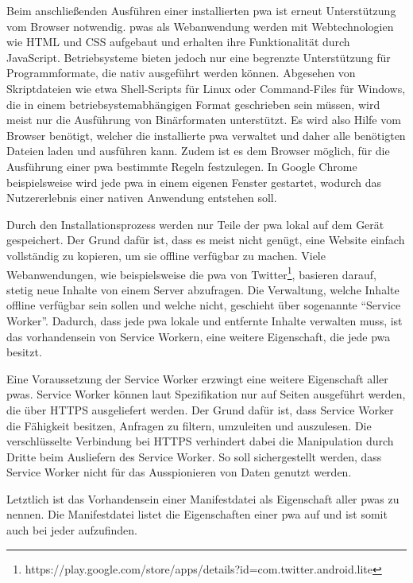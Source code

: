\documentclass[12pt, parskip=half]{scrartcl}       %
\begin{document}
Beim anschließenden Ausführen einer installierten \ac{pwa} ist erneut Unterstützung vom Browser notwendig.
\acp{pwa} als Webanwendung werden mit Webtechnologien wie HTML und CSS aufgebaut und erhalten ihre Funktionalität durch JavaScript.
Betriebsysteme bieten jedoch nur eine begrenzte Unterstützung für Programmformate, die nativ ausgeführt werden können.
Abgesehen von Skriptdateien wie etwa Shell-Scripts für Linux oder Command-Files für Windows, die in einem betriebsystemabhängigen Format geschrieben sein müssen, wird meist nur die Ausführung von Binärformaten unterstützt\cite{fisher_executablelist}.
Es wird also Hilfe vom Browser benötigt, welcher die installierte \ac{pwa} verwaltet und daher alle benötigten Dateien laden und ausführen kann.
Zudem ist es dem Browser möglich, für die Ausführung einer \ac{pwa} bestimmte Regeln festzulegen.
In Google Chrome beispielsweise wird jede \ac{pwa} in einem eigenen Fenster gestartet, wodurch das Nutzererlebnis einer nativen Anwendung entstehen soll\cite{googledevs_pwa}.

Durch den Installationsprozess werden nur Teile der \ac{pwa} lokal auf dem Gerät gespeichert.
Der Grund dafür ist, dass es meist nicht genügt, eine Website einfach vollständig zu kopieren, um sie offline verfügbar zu machen.
Viele Webanwendungen, wie beispielsweise die \ac{pwa} von Twitter\footnote{https://play.google.com/store/apps/details?id=com.twitter.android.lite}, basieren darauf, stetig neue Inhalte von einem Server abzufragen.
Die Verwaltung, welche Inhalte offline verfügbar sein sollen und welche nicht, geschieht über sogenannte \enquote{Service Worker}.
Dadurch, dass jede \ac{pwa} lokale und entfernte Inhalte verwalten muss, ist das vorhandensein von Service Workern, eine weitere Eigenschaft, die jede \ac{pwa} besitzt.

Eine Voraussetzung der Service Worker erzwingt eine weitere Eigenschaft aller \acp{pwa}.
Service Worker können laut Spezifikation nur auf Seiten ausgeführt werden, die über HTTPS ausgeliefert werden.
Der Grund dafür ist, dass Service Worker die Fähigkeit besitzen, Anfragen zu filtern, umzuleiten und auszulesen.
Die verschlüsselte Verbindung bei HTTPS verhindert dabei die Manipulation durch Dritte beim Ausliefern des Service Worker.
So soll sichergestellt werden, dass Service Worker nicht für das Ausspionieren von Daten genutzt werden\cite{ServiceWorker_explained}.

Letztlich ist das Vorhandensein einer Manifestdatei als Eigenschaft aller \acp{pwa} zu nennen.
Die Manifestdatei listet die Eigenschaften einer \ac{pwa} auf und ist somit auch bei jeder aufzufinden.
\end{document}
